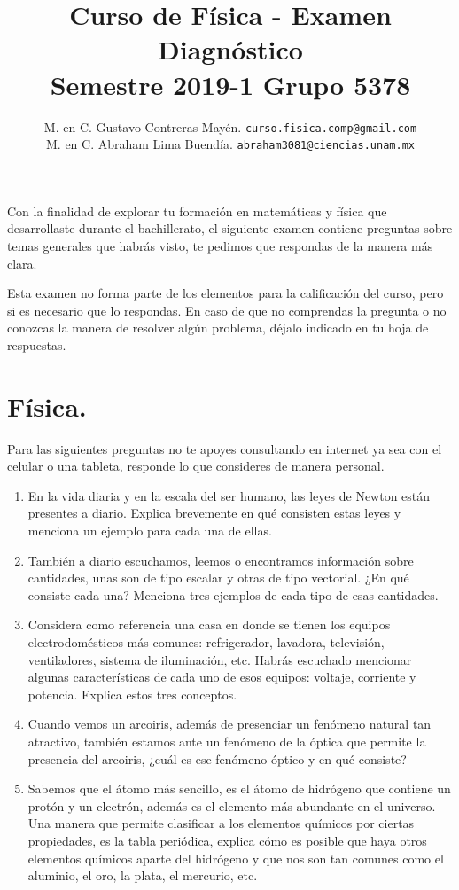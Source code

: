 \documentclass[12pt]{article}
\author{M. en C. Gustavo Contreras Mayén. \texttt{curso.fisica.comp@gmail.com}\\
    M. en C. Abraham Lima Buendía. \texttt{abraham3081@ciencias.unam.mx}}
\title{Curso de Física - Examen Diagnóstico\\{\large Semestre 2019-1 Grupo 5378}}
\date{ }
\begin{document}
\renewcommand\labelenumii{\theenumi.{\arabic{enumii}}}
\maketitle
\fontsize{12}{12}\selectfont
Con la finalidad de explorar tu formación en matemáticas y física que desarrollaste durante el bachillerato, el siguiente examen contiene preguntas sobre temas generales que habrás visto, te pedimos que respondas de la manera más clara.

Esta examen no forma parte de los elementos para la calificación del curso, pero si es necesario que lo respondas. En caso de que no comprendas la pregunta o no conozcas la manera de resolver algún problema, déjalo indicado en tu hoja de respuestas.

\section{Física.}
Para las siguientes preguntas no te apoyes consultando en internet ya sea con el celular o una tableta, responde lo que consideres de manera personal.
\begin{enumerate}
\item En la vida diaria y en la escala del ser humano, las leyes de Newton están presentes a diario. Explica brevemente en qué consisten estas leyes y menciona un ejemplo para cada una de ellas.
\item También a diario escuchamos, leemos o encontramos información sobre cantidades, unas son de tipo escalar y otras de tipo vectorial. ¿En qué consiste cada una? Menciona tres ejemplos de cada tipo de esas cantidades.
\item Considera como referencia una casa en donde se tienen los equipos electrodomésticos más comunes: refrigerador, lavadora, televisión, ventiladores, sistema de iluminación, etc. Habrás escuchado mencionar algunas características de cada uno de esos equipos: voltaje, corriente y potencia. Explica estos tres conceptos.
\item Cuando vemos un arcoiris, además de presenciar un fenómeno natural tan atractivo, también estamos ante un fenómeno de la óptica que permite la presencia del arcoiris, ¿cuál es ese fenómeno óptico y en qué consiste?
\item Sabemos que el átomo más sencillo, es el átomo de hidrógeno que contiene un protón y un electrón, además es el elemento más abundante en el universo. Una manera que permite clasificar a los elementos químicos por ciertas propiedades, es la tabla periódica, explica cómo es posible que haya otros elementos químicos aparte del hidrógeno y que nos son tan comunes como el aluminio, el oro, la plata, el mercurio, etc.
\end{enumerate}
\end{document}
